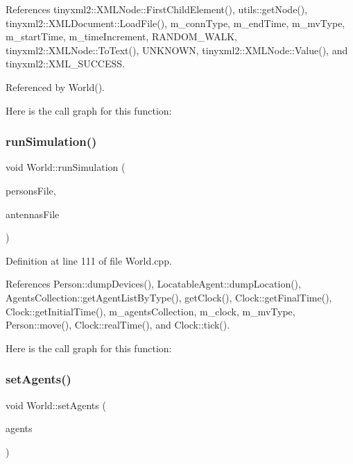 References tinyxml2\+::\+X\+M\+L\+Node\+::\+First\+Child\+Element(), utils\+::get\+Node(), tinyxml2\+::\+X\+M\+L\+Document\+::\+Load\+File(), m\+\_\+conn\+Type, m\+\_\+end\+Time, m\+\_\+mv\+Type, m\+\_\+start\+Time, m\+\_\+time\+Increment, R\+A\+N\+D\+O\+M\+\_\+\+W\+A\+LK, tinyxml2\+::\+X\+M\+L\+Node\+::\+To\+Text(), U\+N\+K\+N\+O\+WN, tinyxml2\+::\+X\+M\+L\+Node\+::\+Value(), and tinyxml2\+::\+X\+M\+L\+\_\+\+S\+U\+C\+C\+E\+SS.



Referenced by World().

Here is the call graph for this function\+:
\mbox{\label{class_world_af8d69e177beec5a9cf3c200f292db7db}} 
\subsubsection{run\+Simulation()}
{\footnotesize\ttfamily void World\+::run\+Simulation (\begin{DoxyParamCaption}\item[{string \&}]{persons\+File,  }\item[{string \&}]{antennas\+File }\end{DoxyParamCaption})\hspace{0.3cm}{\ttfamily [noexcept]}}



Definition at line 111 of file World.\+cpp.



References Person\+::dump\+Devices(), Locatable\+Agent\+::dump\+Location(), Agents\+Collection\+::get\+Agent\+List\+By\+Type(), get\+Clock(), Clock\+::get\+Final\+Time(), Clock\+::get\+Initial\+Time(), m\+\_\+agents\+Collection, m\+\_\+clock, m\+\_\+mv\+Type, Person\+::move(), Clock\+::real\+Time(), and Clock\+::tick().

Here is the call graph for this function\+:
\mbox{\label{class_world_afa8e5c2943c72aa664590abbb024896b}} 
\subsubsection{set\+Agents()}
{\footnotesize\ttfamily void World\+::set\+Agents (\begin{DoxyParamCaption}\item[{\textbf{ Agents\+Collection} $\ast$}]{agents }\end{DoxyParamCaption})}



